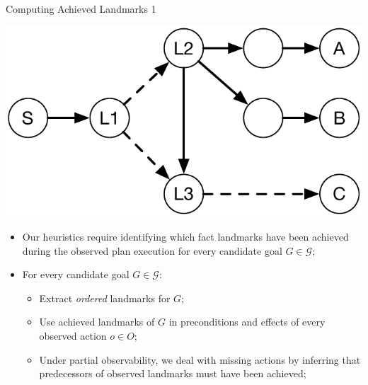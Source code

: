 \documentclass{beamer}
\newcommand{\todo}[1]{ {\color{red} #1} }
\def\masterclass{1}
\begin{document}

    \begin{frame}{Computing Achieved Landmarks}
		\if\masterclass1
		\fi
		\begin{center}
		    \includegraphics[width=.4\textwidth]{example.pdf} 
		\end{center}
		
       	\begin{itemize}
       		\item Our heuristics require identifying which fact landmarks have been achieved during the observed plan execution for every candidate goal $G \in \mathcal{G}$;
            \item For every candidate goal $G \in \mathcal{G}$:
            	\begin{itemize}
                	\item Extract \emph{ordered} landmarks for $G$;
                    \item Use achieved landmarks of $G$ in preconditions and effects of every observed action $o \in O$;
                   \item Under partial observability, we deal with missing actions by inferring that predecessors of observed landmarks must have been achieved;
                \end{itemize}
		\end{itemize}
    \end{frame}
	
\end{document}
